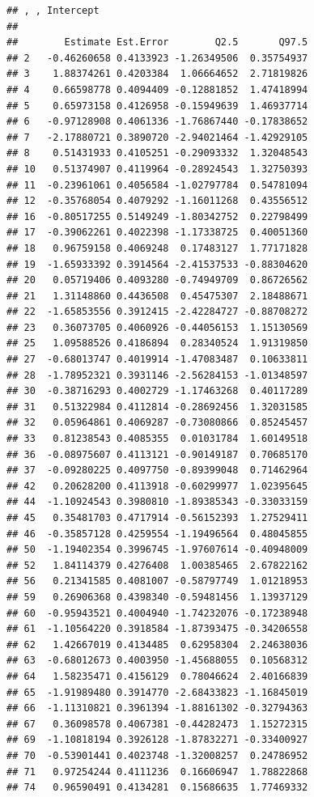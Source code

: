 \documentclass[
  man]{apa7}
\begin{document}
\begin{verbatim}
## , , Intercept
## 
##        Estimate Est.Error        Q2.5       Q97.5
## 2   -0.46260658 0.4133923 -1.26349506  0.35754937
## 3    1.88374261 0.4203384  1.06664652  2.71819826
## 4    0.66598778 0.4094409 -0.12881852  1.47418994
## 5    0.65973158 0.4126958 -0.15949639  1.46937714
## 6   -0.97128908 0.4061336 -1.76867440 -0.17838652
## 7   -2.17880721 0.3890720 -2.94021464 -1.42929105
## 8    0.51431933 0.4105251 -0.29093332  1.32048543
## 10   0.51374907 0.4119964 -0.28924543  1.32750393
## 11  -0.23961061 0.4056584 -1.02797784  0.54781094
## 12  -0.35768054 0.4079292 -1.16011268  0.43556512
## 16  -0.80517255 0.5149249 -1.80342752  0.22798499
## 17  -0.39062261 0.4022398 -1.17338725  0.40051360
## 18   0.96759158 0.4069248  0.17483127  1.77171828
## 19  -1.65933392 0.3914564 -2.41537533 -0.88304620
## 20   0.05719406 0.4093280 -0.74949709  0.86726562
## 21   1.31148860 0.4436508  0.45475307  2.18488671
## 22  -1.65853556 0.3912415 -2.42284727 -0.88708272
## 23   0.36073705 0.4060926 -0.44056153  1.15130569
## 25   1.09588526 0.4186894  0.28340524  1.91319850
## 27  -0.68013747 0.4019914 -1.47083487  0.10633811
## 28  -1.78952321 0.3931146 -2.56284153 -1.01348597
## 30  -0.38716293 0.4002729 -1.17463268  0.40117289
## 31   0.51322984 0.4112814 -0.28692456  1.32031585
## 32   0.05964861 0.4069287 -0.73080866  0.85245457
## 33   0.81238543 0.4085355  0.01031784  1.60149518
## 36  -0.08975607 0.4113121 -0.90149187  0.70685170
## 37  -0.09280225 0.4097750 -0.89399048  0.71462964
## 42   0.20628200 0.4113918 -0.60299977  1.02395645
## 44  -1.10924543 0.3980810 -1.89385343 -0.33033159
## 45   0.35481703 0.4717914 -0.56152393  1.27529411
## 46  -0.35857128 0.4259554 -1.19496564  0.48045855
## 50  -1.19402354 0.3996745 -1.97607614 -0.40948009
## 52   1.84114379 0.4276408  1.00385465  2.67822162
## 56   0.21341585 0.4081007 -0.58797749  1.01218953
## 59   0.26906368 0.4398340 -0.59481456  1.13937129
## 60  -0.95943521 0.4004940 -1.74232076 -0.17238948
## 61  -1.10564220 0.3918584 -1.87393475 -0.34206558
## 62   1.42667019 0.4134485  0.62958304  2.24638036
## 63  -0.68012673 0.4003950 -1.45688055  0.10568312
## 64   1.58235471 0.4156129  0.78046624  2.40166839
## 65  -1.91989480 0.3914770 -2.68433823 -1.16845019
## 66  -1.11310821 0.3961394 -1.88161302 -0.32794363
## 67   0.36098578 0.4067381 -0.44282473  1.15272315
## 69  -1.10818194 0.3926128 -1.87832271 -0.33400927
## 70  -0.53901441 0.4023748 -1.32008257  0.24786952
## 71   0.97254244 0.4111236  0.16606947  1.78822868
## 74   0.96590491 0.4134281  0.15686635  1.77469332

\end{verbatim}
\end{document}
